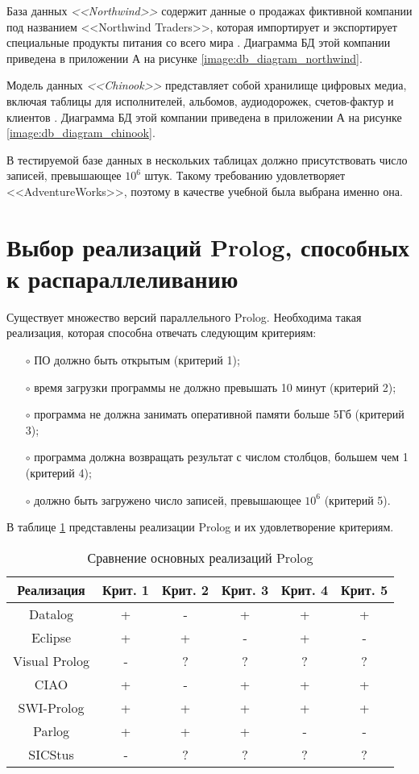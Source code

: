 База данных \textit{<<Northwind>>} содержит данные о продажах фиктивной компании под названием <<Northwind Traders>>, которая импортирует и экспортирует специальные продукты питания со всего мира \cite{northwind}. Диаграмма БД этой компании приведена в приложении А на рисунке \ref{image:db_diagram_northwind}.

Модель данных \textit{<<Chinook>>} представляет собой хранилище цифровых медиа, включая таблицы для исполнителей, альбомов, аудиодорожек, счетов-фактур и клиентов \cite{chinook}. Диаграмма БД этой компании приведена в приложении А на рисунке \ref{image:db_diagram_chinook}.

В тестируемой базе данных в нескольких таблицах должно присутствовать число записей, превышающее $10^6$ штук. Такому требованию удовлетворяет <<AdventureWorks>>, поэтому в качестве учебной была выбрана именно она.

\section{Выбор реализаций Prolog, способных к распараллеливанию}
\vspace{-0.5cm}
Существует множество версий параллельного Prolog. Необходима такая реализация, которая способна отвечать следующим критериям:
\begin{itemize}
    \item[$\circ$] ПО должно быть открытым (критерий 1);
    \item[$\circ$] время загрузки программы не должно превышать 10 минут (критерий 2);
    \item[$\circ$] программа не должна занимать оперативной памяти больше 5Гб (критерий 3);
    \item[$\circ$] программа должна возвращать результат с числом столбцов, большем чем 1 (критерий 4);
    \item[$\circ$] должно быть загружено число записей, превышающее $10^6$ (критерий 5).
\end{itemize}

В таблице \ref{table:compare_prolog_versions} представлены реализации Prolog и их удовлетворение критериям.
\begin{table}[ht!]
	\centering
	\captionsetup{singlelinecheck = false, justification=raggedright}
	\caption{Сравнение основных реализаций Prolog}
	\label{table:compare_prolog_versions}
	\begin{tabular}{|c|c|c|c|c|c|}
		\hline	
		Реализация & Крит. 1 & Крит. 2 & Крит. 3 & Крит. 4 & Крит. 5 \\ \hline
		Datalog  & + & - & +  & + & +\\ \hline
		Eclipse  & + & + & - & + & - \\ \hline
		Visual Prolog & - & ? & ? & ? & ? \\ \hline
		CIAO & + & - & + & + & +  \\ \hline
		SWI-Prolog	& + & + & + & + & + \\ \hline
		Parlog	& + & + & + & - & - \\ \hline
		SICStus	& - & ? & ? & ? & ? \\ \hline
	\end{tabular}
\end{table}

